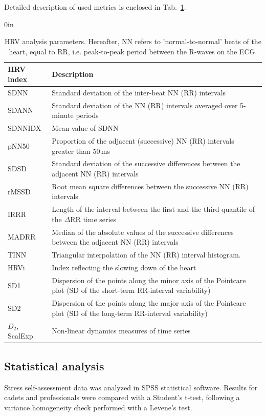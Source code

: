 \documentclass[smallcondensed]{svjour3}
\begin{document}
Detailed description of used metrics is enclosed in Tab.~\ref{tab:hrv_ann}.

\begin{table}[ht]
\begin{adjustwidth}{}{0in}
\caption{HRV analysis parameters. Hereafter, NN refers to 'normal-to-normal' beats of the heart, equal to RR, i.e. peak-to-peak period between the R-waves on the ECG.}
\label{tab:hrv_ann}
\begin{tabular}{lp{}}
\hline
HRV index & Description \\
\hline
SDNN & Standard deviation of the inter-beat NN (RR) intervals \\
SDANN & Standard deviation of the NN (RR) intervals averaged over 5-minute periods \\
SDNNIDX & Mean value of SDNN \\
pNN50 & Proportion of the adjacent (successive) NN (RR) intervals greater than 50\,ms \\
SDSD & Standard deviation of the successive differences between the adjacent NN (RR) intervals \\
rMSSD & Root mean square differences between the successive NN (RR) intervals \\
IRRR & Length of the interval between the first and the third quantile of the $\Delta$RR time series \\
MADRR & Median of the absolute values of the successive differences between the adjacent NN (RR) intervals \\
TINN & Triangular interpolation of the NN (RR) interval histogram. \\
HRVi & Index reflecting the slowing down of the heart \\
SD1 & Dispersion of the points along the minor axis of the Pointcare plot (SD of the short-term RR-interval variability) \\
SD2 & Dispersion of the points along the major axis of the Pointcare plot (SD of the long-term RR-interval variability)\\
$D_2$, ScalExp & Non-linear dynamics measures of time series \\
\hline
\end{tabular}
\end{adjustwidth}
\end{table}

\subsection{Statistical analysis}
Stress self-assessment data was analyzed in SPSS statistical software. Results for cadets and professionals were compared with a Student's t-test, following a variance homogeneity check performed with a Levene's test.
\end{document}
